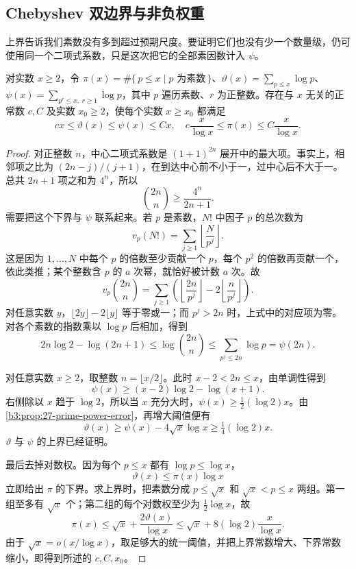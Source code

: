 \subsection{Chebyshev 双边界与非负权重}
\label{b3:subsec:270104}

上界告诉我们素数没有多到超过预期尺度。要证明它们也没有少一个数量级，仍可使用同一个二项式系数，只是这次把它的全部素因数计入 \(\psi\)。

\begin{proposition}
\label{b3:prop:27-chebyshev-two-sided}
对实数 \(x\ge2\)，令 \(\pi(x)=\#\{\,p\le x\mid p\text{ 为素数}\,\}\)、\(\vartheta(x)=\sum_{p\le x}\log p\)、\(\psi(x)=\sum_{p^r\le x,\ r\ge1}\log p\)，其中 \(p\) 遍历素数、\(r\) 为正整数。存在与 \(x\) 无关的正常数 \(c,C\) 及实数 \(x_0\ge2\)，使每个实数 \(x\ge x_0\) 都满足
\[
 cx\le\vartheta(x)\le\psi(x)\le Cx,
 \quad
 c\frac{x}{\log x}\le\pi(x)\le C\frac{x}{\log x}.
\]
\end{proposition}
\begin{proof}
对正整数 \(n\)，中心二项式系数是 \((1+1)^{2n}\) 展开中的最大项。事实上，相邻项之比为 \((2n-j)/(j+1)\)，在到达中心前不小于一，过中心后不大于一。总共 \(2n+1\) 项之和为 \(4^n\)，所以
\[
 \binom{2n}{n}\ge\frac{4^n}{2n+1}.
\]
需要把这个下界与 \(\psi\) 联系起来。若 \(p\) 是素数，\(N!\) 中因子 \(p\) 的总次数为
\[
 v_p(N!)=\sum_{j\ge1}\left\lfloor\frac{N}{p^j}\right\rfloor.
\]
这是因为 \(1,\ldots,N\) 中每个 \(p\) 的倍数至少贡献一个 \(p\)，每个 \(p^2\) 的倍数再贡献一个，依此类推；某个整数含 \(p\) 的 \(a\) 次幂，就恰好被计数 \(a\) 次。故
\[
 v_p\binom{2n}{n}
 =\sum_{j\ge1}
   \left(\left\lfloor\frac{2n}{p^j}\right\rfloor
               -2\left\lfloor\frac n{p^j}\right\rfloor\right).
\]
对任意实数 \(y\)，\(\lfloor2y\rfloor-2\lfloor y\rfloor\) 等于零或一；而 \(p^j>2n\) 时，上式中的对应项为零。对各个素数的指数乘以 \(\log p\) 后相加，得到
\[
 2n\log2-\log(2n+1)
 \le\log\binom{2n}{n}
 \le\sum_{p^j\le2n}\log p
 =\psi(2n).
\]

对任意实数 \(x\ge2\)，取整数 \(n=\lfloor x/2\rfloor\)。此时 \(x-2<2n\le x\)，由单调性得到
\[
 \psi(x)\ge(x-2)\log2-\log(x+1).
\]
右侧除以 \(x\) 趋于 \(\log2\)，所以当 \(x\) 充分大时，\(\psi(x)\ge\tfrac12(\log2)x\)。由\cref{b3:prop:27-prime-power-error}，再增大阈值便有
\[
 \vartheta(x)\ge\psi(x)-4\sqrt x\log x
 \ge\tfrac14(\log2)x.
\]
\(\vartheta\) 与 \(\psi\) 的上界已经证明。

最后去掉对数权。因为每个 \(p\le x\) 都有 \(\log p\le\log x\)，
\[
 \vartheta(x)\le\pi(x)\log x
\]
立即给出 \(\pi\) 的下界。求上界时，把素数分成 \(p\le\sqrt x\) 和 \(\sqrt x<p\le x\) 两组。第一组至多有 \(\sqrt x\) 个；第二组的每个对数权至少为 \(\tfrac12\log x\)，故
\[
 \pi(x)\le\sqrt x+\frac{2\vartheta(x)}{\log x}
 \le\sqrt x+8(\log2)\frac{x}{\log x}.
\]
由于 \(\sqrt x=o(x/\log x)\)，取足够大的统一阈值，并把上界常数增大、下界常数缩小，即得到所述的 \(c,C,x_0\)。
\end{proof}

